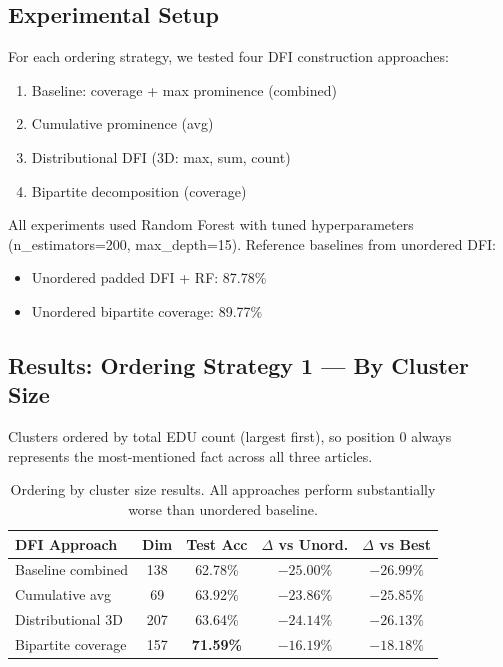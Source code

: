 \documentclass[12pt,a4paper]{article}
\begin{document}
\subsection{Experimental Setup}

For each ordering strategy, we tested four DFI construction approaches:
\begin{enumerate}
\item Baseline: coverage + max prominence (combined)
\item Cumulative prominence (avg)
\item Distributional DFI (3D: max, sum, count)
\item Bipartite decomposition (coverage)
\end{enumerate}

All experiments used Random Forest with tuned hyperparameters (n\_estimators=200, max\_depth=15).
Reference baselines from unordered DFI:
\begin{itemize}
\item Unordered padded DFI + RF: 87.78\%
\item Unordered bipartite coverage: 89.77\%
\end{itemize}

\subsection{Results: Ordering Strategy 1 --- By Cluster Size}

Clusters ordered by total EDU count (largest first), so position 0 always represents
the most-mentioned fact across all three articles.

\begin{table}[h]
\centering
\small
\begin{tabular}{lcccc}
\hline
\textbf{DFI Approach} & \textbf{Dim} & \textbf{Test Acc} & \textbf{$\Delta$ vs Unord.} & \textbf{$\Delta$ vs Best} \\
\hline
Baseline combined & 138 & 62.78\% & $-25.00\%$ & $-26.99\%$ \\
Cumulative avg & 69 & 63.92\% & $-23.86\%$ & $-25.85\%$ \\
Distributional 3D & 207 & 63.64\% & $-24.14\%$ & $-26.13\%$ \\
Bipartite coverage & 157 & \textbf{71.59\%} & $-16.19\%$ & $-18.18\%$ \\
\hline
\end{tabular}
\caption{Ordering by cluster size results. All approaches perform substantially worse than unordered baseline.}
\label{tab:ordering_size}
\end{table}
\end{document}
